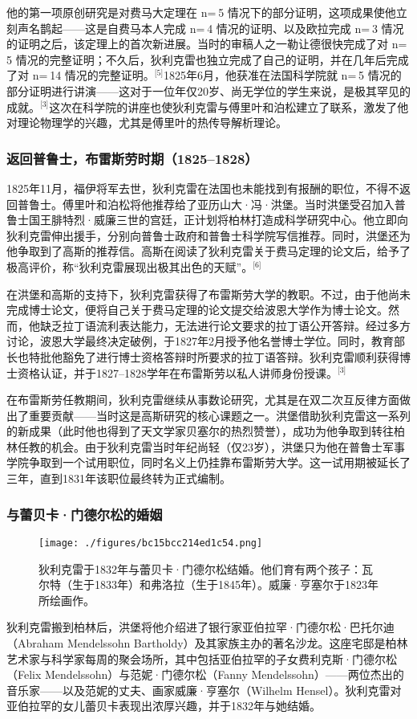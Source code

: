 他的第一项原创研究是对费马大定理在 n= 5 情况下的部分证明，这项成果使他立刻声名鹊起——这是自费马本人完成 n= 4 情况的证明、以及欧拉完成 n= 3 情况的证明之后，该定理上的首次新进展。当时的审稿人之一勒让德很快完成了对 n= 5 情况的完整证明；不久后，狄利克雷也独立完成了自己的证明，并在几年后完成了对 n= 14 情况的完整证明。\(^\text{[5]}\)1825年6月，他获准在法国科学院就 n= 5 情况的部分证明进行讲演——这对于一位年仅20岁、尚无学位的学生来说，是极其罕见的成就。\(^\text{[3]}\)这次在科学院的讲座也使狄利克雷与傅里叶和泊松建立了联系，激发了他对理论物理学的兴趣，尤其是傅里叶的热传导解析理论。
\subsubsection{返回普鲁士，布雷斯劳时期（1825–1828）}
1825年11月，福伊将军去世，狄利克雷在法国也未能找到有报酬的职位，不得不返回普鲁士。傅里叶和泊松将他推荐给了亚历山大·冯·洪堡。当时洪堡受召加入普鲁士国王腓特烈·威廉三世的宫廷，正计划将柏林打造成科学研究中心。他立即向狄利克雷伸出援手，分别向普鲁士政府和普鲁士科学院写信推荐。同时，洪堡还为他争取到了高斯的推荐信。高斯在阅读了狄利克雷关于费马定理的论文后，给予了极高评价，称“狄利克雷展现出极其出色的天赋”。\(^\text{[6]}\)

在洪堡和高斯的支持下，狄利克雷获得了布雷斯劳大学的教职。不过，由于他尚未完成博士论文，便将自己关于费马定理的论文提交给波恩大学作为博士论文。然而，他缺乏拉丁语流利表达能力，无法进行论文要求的拉丁语公开答辩。经过多方讨论，波恩大学最终决定破例，于1827年2月授予他名誉博士学位。同时，教育部长也特批他豁免了进行博士资格答辩时所要求的拉丁语答辩。狄利克雷顺利获得博士资格认证，并于1827–1828学年在布雷斯劳以私人讲师身份授课。\(^\text{[3]}\)

在布雷斯劳任教期间，狄利克雷继续从事数论研究，尤其是在双二次互反律方面做出了重要贡献——当时这是高斯研究的核心课题之一。洪堡借助狄利克雷这一系列的新成果（此时他也得到了天文学家贝塞尔的热烈赞誉），成功为他争取到转往柏林任教的机会。由于狄利克雷当时年纪尚轻（仅23岁），洪堡只为他在普鲁士军事学院争取到一个试用职位，同时名义上仍挂靠布雷斯劳大学。这一试用期被延长了三年，直到1831年该职位最终转为正式编制。
\subsubsection{与蕾贝卡·门德尔松的婚姻}
\begin{figure}[ht]
\centering
\texttt{[image: ./figures/bc15bcc214ed1c54.png]}
\caption{狄利克雷于1832年与蕾贝卡·门德尔松结婚。他们育有两个孩子：瓦尔特（生于1833年）和弗洛拉（生于1845年）。威廉·亨塞尔于1823年所绘画作。} \label{fig_YBGL_1}
\end{figure}
狄利克雷搬到柏林后，洪堡将他介绍进了银行家亚伯拉罕·门德尔松·巴托尔迪（Abraham Mendelssohn Bartholdy）及其家族主办的著名沙龙。这座宅邸是柏林艺术家与科学家每周的聚会场所，其中包括亚伯拉罕的子女费利克斯·门德尔松（Felix Mendelssohn）与范妮·门德尔松（Fanny Mendelssohn）——两位杰出的音乐家——以及范妮的丈夫、画家威廉·亨塞尔（Wilhelm Hensel）。狄利克雷对亚伯拉罕的女儿蕾贝卡表现出浓厚兴趣，并于1832年与她结婚。

